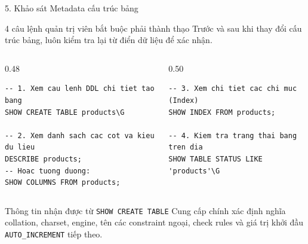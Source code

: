 \documentclass[aspectratio=169,11pt]{beamer}
\newcommand{\smallgap}{\vspace{0.2em}}
\begin{document}
\begin{frame}[fragile]{5. Khảo sát Metadata cấu trúc bảng}
\begin{block}{4 câu lệnh quản trị viên bắt buộc phải thành thạo}
  Trước và sau khi thay đổi cấu trúc bảng, luôn kiểm tra lại từ điển dữ liệu để xác nhận.
\end{block}

\begin{columns}[t]
  \begin{column}{0.48\textwidth}
\begin{lstlisting}
-- 1. Xem cau lenh DDL chi tiet tao bang
SHOW CREATE TABLE products\G

-- 2. Xem danh sach cac cot va kieu du lieu
DESCRIBE products;
-- Hoac tuong duong:
SHOW COLUMNS FROM products;
\end{lstlisting}
  \end{column}
  \begin{column}{0.50\textwidth}
\begin{lstlisting}
-- 3. Xem chi tiet cac chi muc (Index)
SHOW INDEX FROM products;

-- 4. Kiem tra trang thai bang tren dia
SHOW TABLE STATUS LIKE 'products'\G
\end{lstlisting}
  \end{column}
\end{columns}

\smallgap
\begin{exampleblock}{Thông tin nhận được từ \texttt{SHOW CREATE TABLE}}
  Cung cấp chính xác định nghĩa collation, charset, engine, tên các constraint ngoại, check rules và giá trị khởi đầu \texttt{AUTO\_INCREMENT} tiếp theo.
\end{exampleblock}
\end{frame}

\end{document}
